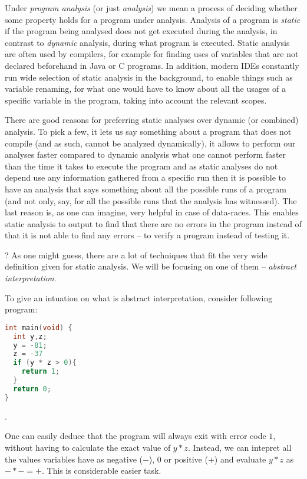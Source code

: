 \documentclass[..thesis.tex]{subfiles}
\begin{document}
Under \textit{program analysis} (or just \textit{analysis}) we mean a process of deciding whether some property holds for a program under analysis.
Analysis of a program is \textit{static} if the program being analysed does not get executed during the analysis, in contrast to \textit{dynamic} analysis,
during what program is executed. Static analysis are often used by compilers, for example for finding uses of variables that are not declared beforehand
in Java or C programs. In addition, modern IDEs constantly run wide selection of static analysis in the background, to enable things such as variable renaming,
for what one would have to know about all the usages of a specific variable in the program, taking into account the relevant scopes. 

There are good reasons for preferring static analyses over dynamic (or combined) analysis.
To pick a few, it lets us say something about a program that does not compile (and as such, cannot be analyzed dynamically),
it allows to perform our analyses faster compared to dynamic analysis what one cannot perform faster than the time it takes to execute the program
and as static analyses do not depend use any information gathered from a specific run then it is possible to have an analysis that says something
about all the possible runs of a program (and not only, say, for all the possible runs that the analysis has witnessed).
The last reason is, as one can imagine, very helpful in case of data-races. This enables static analysis to output to find that there
 are no errors in the program instead of that it is not able to find any errors -- to verify a program instead of testing it.

?
As one might guess, there are a lot of techniques that fit the very wide definition given for static analysis. We will be focusing on one of them -- \textit{abstract interpretation}.

To give an intuation on what is abstract interpretation, consider following program:

\begin{lstlisting}[language=C,style=def]
int main(void) {
  int y,z;
  y = -81;
  z = -37
  if (y * z > 0){
    return 1;
  }
  return 0;
}
\end{lstlisting}.

One can easily deduce that the program will always exit with error code $1$, without having to calculate the exact value of  $y*z$.
Instead, we can intepret all the values variables have as negative ($-$), $0$ or positive ($+$) and evaluate $y * z$ as $-*- = +$.
This is considerable easier task.
\end{document}
